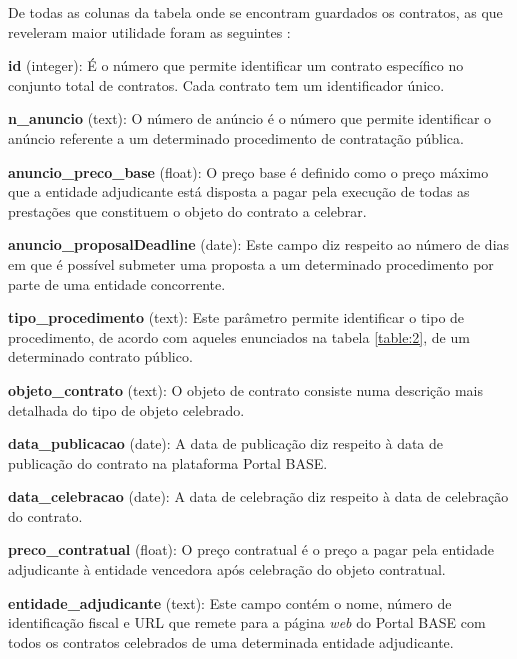 De todas as colunas da tabela onde se encontram guardados os contratos, as que reveleram maior utilidade foram as seguintes : 


\begin{my_itemize}
	
\item \textbf{id} (integer): É o número que permite identificar um contrato específico no conjunto total de contratos. Cada contrato tem um identificador único.

\item \textbf{n\_anuncio} (text): O número de anúncio é o número que permite identificar o anúncio referente a um determinado procedimento de contratação pública.


\item \textbf{anuncio\_preco\_base} (float): O preço base é definido como o preço máximo que a entidade adjudicante está disposta a pagar pela execução de todas as prestações que constituem o objeto do contrato a celebrar.

\item \textbf{anuncio\_proposalDeadline} (date): Este campo diz respeito ao número de dias em que é possível submeter uma proposta a um determinado procedimento por parte de uma entidade concorrente. 

\item \textbf{tipo\_procedimento} (text): Este parâmetro permite identificar o tipo de procedimento, de acordo com aqueles enunciados na tabela \ref{table:2}, de um  determinado contrato público.

\item \textbf{objeto\_contrato} (text): O objeto de contrato consiste numa descrição mais detalhada do tipo de objeto celebrado. 

\item \textbf{data\_publicacao} (date): A data de publicação diz respeito à data de publicação do contrato na plataforma Portal BASE.

\item \textbf{data\_celebracao} (date): A data de celebração diz respeito à data de celebração do contrato. 

\item \textbf{preco\_contratual} (float): O  preço contratual é o preço a pagar pela entidade adjudicante à entidade vencedora após celebração do objeto contratual. 

\item \textbf{entidade\_adjudicante} (text): Este campo contém o nome, número de identificação fiscal e URL que remete para a página \textit{web} do Portal BASE com todos os contratos celebrados de uma determinada entidade adjudicante. 


\end{my_itemize}
